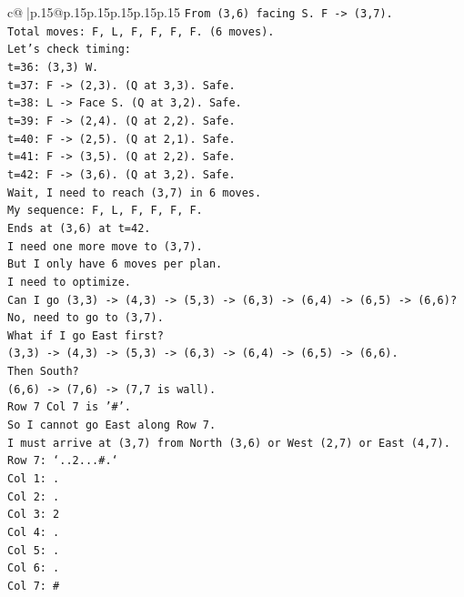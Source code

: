 \documentclass{article}
\begin{document}
{\begin{supertabular}{c@{$\;$}|p{.15\linewidth}@{}p{.15\linewidth}p{.15\linewidth}p{.15\linewidth}p{.15\linewidth}p{.15\linewidth}}
{{{\texttt{From (3,6) facing S. F {-}> (3,7).} \\
\texttt{Total moves: F, L, F, F, F, F. (6 moves).} \\
\texttt{Let's check timing:} \\
\texttt{t=36: (3,3) W.} \\
\texttt{t=37: F {-}> (2,3). (Q at 3,3). Safe.} \\
\texttt{t=38: L {-}> Face S. (Q at 3,2). Safe.} \\
\texttt{t=39: F {-}> (2,4). (Q at 2,2). Safe.} \\
\texttt{t=40: F {-}> (2,5). (Q at 2,1). Safe.} \\
\texttt{t=41: F {-}> (3,5). (Q at 2,2). Safe.} \\
\texttt{t=42: F {-}> (3,6). (Q at 3,2). Safe.} \\
\texttt{Wait, I need to reach (3,7) in 6 moves.} \\
\texttt{My sequence: F, L, F, F, F, F.} \\
\texttt{Ends at (3,6) at t=42.} \\
\texttt{I need one more move to (3,7).} \\
\texttt{But I only have 6 moves per plan.} \\
\texttt{I need to optimize.} \\
\texttt{Can I go (3,3) {-}> (4,3) {-}> (5,3) {-}> (6,3) {-}> (6,4) {-}> (6,5) {-}> (6,6)? No, need to go to (3,7).} \\
\texttt{What if I go East first?} \\
\texttt{(3,3) {-}> (4,3) {-}> (5,3) {-}> (6,3) {-}> (6,4) {-}> (6,5) {-}> (6,6).} \\
\texttt{Then South?} \\
\texttt{(6,6) {-}> (7,6) {-}> (7,7 is wall).} \\
\texttt{Row 7 Col 7 is '\#'.} \\
\texttt{So I cannot go East along Row 7.} \\
\texttt{I must arrive at (3,7) from North (3,6) or West (2,7) or East (4,7).} \\
\texttt{Row 7: `..2...\#.`} \\
\texttt{Col 1: .} \\
\texttt{Col 2: .} \\
\texttt{Col 3: 2} \\
\texttt{Col 4: .} \\
\texttt{Col 5: .} \\
\texttt{Col 6: .} \\
\texttt{Col 7: \#} \\
}}}
\end{supertabular}}
\end{document}
